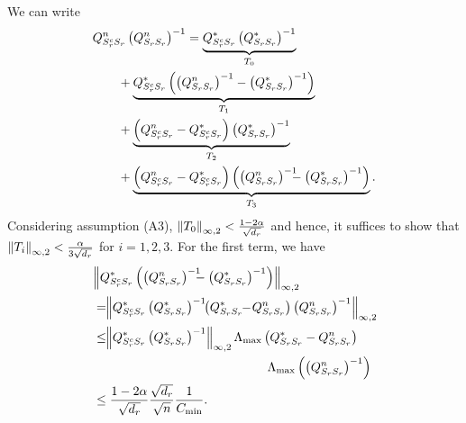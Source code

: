  We can write
\begin{equation}
\begin{aligned}
&Q^n_{S^c_{r}S_{r}}\left(Q^n_{S_{r}S_{r}}\right)^{-1}= \underbrace{Q^*_{S^c_{r}S_{r}}\left(Q^*_{S_{r}S_{r}}\right)^{-1}}_{T_0}\\
&\qquad+\underbrace{Q^*_{S^c_{r}S_{r}} \left(\left(Q^n_{S_{r}S_{r}}\right)^{-1} -\left(Q^*_{S_{r}S_{r}}\right)^{-1}\right)}_{T_1}\\
&\qquad+\underbrace{\left(Q^n_{S^c_{r}S_{r}}-Q^*_{S^c_{r}S_{r}}\right) \left(Q^*_{S_{r}S_{r}}\right)^{-1}}_{T_2}\\
&\qquad+\underbrace{\left(Q^n_{S^c_{r}S_{r}}-Q^*_{S^c_{r}S_{r}}\right) \left(\left(Q^n_{S_{r}S_{r}}\right)^{-1}\!\!\!\! -\left(Q^*_{S_{r}S_{r}}\right)^{-1}\right)}_{T_3}.\\
\end{aligned}
\nonumber
\end{equation}
Considering assumption (A3), $\left\|T_0\right\|_{\infty,2}<\frac{1-2\alpha}{\sqrt{d_{r}}}$ and hence, it suffices to show that $\left\|T_i\right\|_{\infty,2}<\frac{\alpha}{3\sqrt{d_{r}}}$ for $i=1,2,3$. For the first term, we have
\begin{equation}
\begin{aligned}
&\norm{\fisher^*_{\support^c_\svert\support_\svert} \left(\left(\fisher^n_{\support_\svert\support_\svert}\right)^{-1}\!\!\!\! -\left(\fisher^*_{\support_\svert\support_\svert}\right)^{-1}\right)}{\infty,2}\\ &\,=\!\!\norm{\fisher^*_{\support^c_\svert\support_\svert} \left(\fisher^*_{\support_\svert\support_\svert}\right)^{-1}\!\! \left(\fisher^*_{\support_\svert\support_\svert}\!\! -\!\fisher^n_{\support_\svert\support_\svert}\right) \left(\fisher^n_{\support_\svert\support_\svert}\right)^{-1}}{\infty,2}\\
&\,\leq\!\!\norm{\fisher^*_{\support^c_\svert\support_\svert} \left(\fisher^*_{\support_\svert\support_\svert}\right)^{-1}}{\infty,2} \Lambda_{\max}\left(\fisher^*_{\support_\svert\support_\svert} -\fisher^n_{\support_\svert\support_\svert}\right)\\ &\qquad\qquad\qquad\qquad\qquad\qquad\qquad\Lambda_{\max}\left(\left(\fisher^n_{\support_\svert\support_\svert}\right)^{-1}\right)\\
&\,\leq\frac{1-2\alpha}{\sqrt{d_\svert}}\frac{\sqrt{d_\svert}}{\sqrt{n}}\frac{1}{C_{\min}}.
\end{aligned}
\nonumber
\end{equation}
